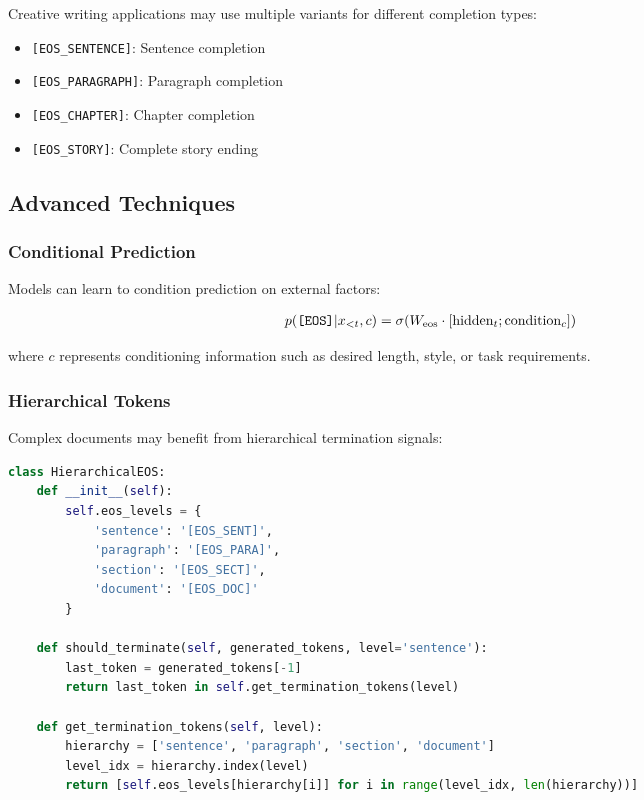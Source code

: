 Creative writing applications may use multiple \eos{} variants for different completion types:

\begin{itemize}
\item \texttt{[EOS\_SENTENCE]}: Sentence completion
\item \texttt{[EOS\_PARAGRAPH]}: Paragraph completion  
\item \texttt{[EOS\_CHAPTER]}: Chapter completion
\item \texttt{[EOS\_STORY]}: Complete story ending
\end{itemize}

\subsection{Advanced \eos{} Techniques}

\subsubsection{Conditional \eos{} Prediction}

Models can learn to condition \eos{} prediction on external factors:

\begin{align}
p(\text{\texttt{[EOS]}{}} | x_{<t}, c) &= \sigma(W_{\text{eos}} \cdot [\text{hidden}_t; \text{condition}_c])
\end{align}

where $c$ represents conditioning information such as desired length, style, or task requirements.

\subsubsection{Hierarchical \eos{} Tokens}

Complex documents may benefit from hierarchical termination signals:

\begin{lstlisting}[language=Python, caption=Hierarchical EOS for document generation]
class HierarchicalEOS:
    def __init__(self):
        self.eos_levels = {
            'sentence': '[EOS_SENT]',
            'paragraph': '[EOS_PARA]', 
            'section': '[EOS_SECT]',
            'document': '[EOS_DOC]'
        }
    
    def should_terminate(self, generated_tokens, level='sentence'):
        last_token = generated_tokens[-1]
        return last_token in self.get_termination_tokens(level)
    
    def get_termination_tokens(self, level):
        hierarchy = ['sentence', 'paragraph', 'section', 'document']
        level_idx = hierarchy.index(level)
        return [self.eos_levels[hierarchy[i]] for i in range(level_idx, len(hierarchy))]
\end{lstlisting}

